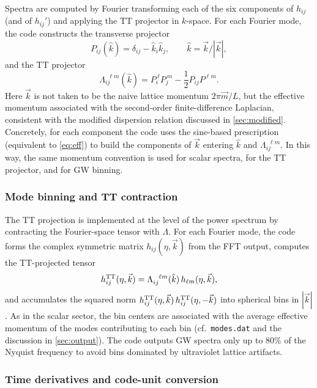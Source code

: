 \documentclass[aps, nofootinbib,superscriptaddress, preprintnumbers, longbibliography]{article}
\begin{document}
Spectra are computed by Fourier transforming each of the six components of $h_{ij}$ (and of $h_{ij}'$) and applying the TT projector in $k$-space. For each Fourier mode, the code constructs the transverse projector
\begin{equation}
P_{ij}(\hat{k})=\delta_{ij}-\hat{k}_i\hat{k}_j,
\qquad
\hat{k}=\vec{k}/|\vec{k}|,
\end{equation}
and the TT projector
\begin{equation}
\label{eq:GW_TT_k_num}
\Lambda_{ij}^{\ \ \ell m}(\hat{k})
=
P_i^{\ \ell} P_j^{\ m}
-\frac12 P_{ij} P^{\ell m}.
\end{equation}
Here $\vec{k}$ is not taken to be the naive lattice momentum $2\pi\vec{m}/L$, but the effective momentum associated with the second-order finite-difference Laplacian, consistent with the modified dispersion relation discussed in \cref{sec:modified}. Concretely, for each component the code uses the sine-based prescription (equivalent to \cref{eq:eff}) to build the components of $\vec{k}$ entering $\hat{k}$ and $\Lambda_{ij}^{\ \ \ell m}$. In this way, the same momentum convention is used for scalar spectra, for the TT projector, and for GW binning.

\subsubsection*{Mode binning and TT contraction}

The TT projection is implemented at the level of the power spectrum by contracting the Fourier-space tensor with $\Lambda$. For each Fourier mode, the code forms the complex symmetric matrix $h_{ij}(\eta,\vec{k})$ from the FFT output, computes the TT-projected tensor
\begin{equation}
h_{ij}^{\rm TT}(\eta,\vec{k})=\Lambda_{ij}^{\ \ \ell m}(\hat{k})\,h_{\ell m}(\eta,\vec{k}),
\end{equation}
and accumulates the squared norm $h_{ij}^{\rm TT}(\eta,\vec{k})\,h_{ij}^{\rm TT}(\eta,-\vec{k})$ into spherical bins in $|\vec{k}|$. As in the scalar sector, the bin centers are associated with the average effective momentum of the modes contributing to each bin (cf.\ \texttt{modes.dat} and the discussion in \cref{sec:output}). The code outputs GW spectra only up to 80\% of the Nyquist frequency to avoid bins dominated by ultraviolet lattice artifacts.

\subsubsection*{Time derivatives and code-unit conversion}
\end{document}
